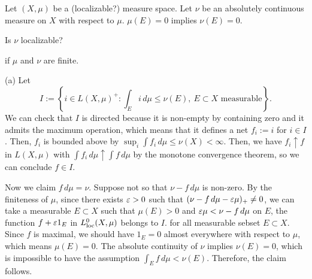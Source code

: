 \documentclass{../../large}
\begin{document}
\begin{prb}
Let $(X,\mu)$ be a (localizable?) measure space.
Let $\nu$ be an absolutely continuous measure on $X$ with respect to $\mu$.
$\mu(E)=0$ implies $\nu(E)=0$.

Is $\nu$ localizable?
\begin{parts}
\item if $\mu$ and $\nu$ are finite.
\end{parts}
\end{prb}
\begin{pf}
(a)
Let
\[I:=\left\{i\in L(X,\mu)^+:\int_Ei\,d\mu\le\nu(E),\ E\subset X\text{ measurable}\right\}.\]
We can check that $I$ is directed because it is non-empty by containing zero and it admits the maximum operation, which means that it defines a net $f_i:=i$ for $i\in I$.
Then, $f_i$ is bounded above by $\sup_i\int f_i\,d\mu\le\nu(X)<\infty$.
Then, we have $f_i\uparrow f$ in $L(X,\mu)$ with $\int f_i\,d\mu\uparrow\int f\,d\mu$ by the monotone convergence theorem, so we can conclude $f\in I$.

Now we claim $f\,d\mu=\nu$.
Suppose not so that $\nu-f\,d\mu$ is non-zero.
By the finiteness of $\mu$, since there exists $\varepsilon>0$ such that $(\nu-f\,d\mu-\varepsilon\mu)_+\ne0$, we can take a measurable $E\subset X$ such that $\mu(E)>0$ and $\varepsilon\mu<\nu-f\,d\mu$ on $E$, the function $f+\varepsilon1_E$ in $L_{\mathrm{loc}}^0(X,\mu)$ belongs to $I$.
for all measurable sebset $E\subset X$.
Since $f$ is maximal, we should have $1_E=0$ almost everywhere with respect to $\mu$, which means $\mu(E)=0$.
The absolute continuity of $\nu$ implies $\nu(E)=0$, which is impossible to have the assumption $\int_Ef\,d\mu<\nu(E)$.
Therefore, the claim follows.

\end{pf}

\begin{prb}
\end{prb}




\begin{prb}[Convolution?]
\end{prb}
\begin{prb}
\end{prb}
\begin{prb}
\end{prb}
\end{document}

